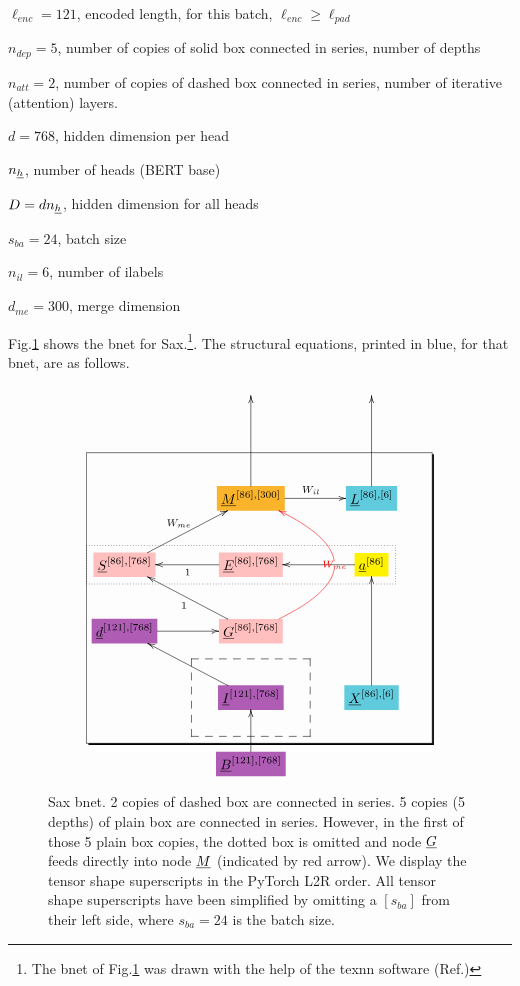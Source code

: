 $\ell_{enc}=121$, encoded length, for this batch, $\ell_{enc}\geq \ell_{pad}$

$n_{dep}=5$, number of copies of solid box connected in series, number of depths

 $n_{att}=2$, number of copies of
dashed box connected in series, number of iterative (attention) layers.


$d=768$, hidden dimension per head

$n_{\underline{h}}$, number of heads (BERT base)

$D=d n_{\underline{h}}$, hidden dimension
for all heads


$s_{ba}=24$, batch size

$n_{il}=6$, number of ilabels

$d_{me}=300$, merge dimension

Fig.\ref{fig-texnn-for-sentence-ax-bnet}
shows the bnet  for Sax.\footnote{The
bnet of Fig.\ref{fig-texnn-for-sentence-ax-bnet}
was drawn with the help of the texnn software (Ref.\cite{texnn})}. The structural equations, printed in 
blue, for that bnet, are as follows.

\begin{figure}[h!]\centering
$$\xymatrix@R=2.5pc@C=3.5pc{
&&
\\
&&
\\
&*+[F*:Dandelion]{\underline{M}^{[86], [300]}}\ar[uu]\ar[r]^{W_{il}}&*+[F*:SkyBlue]{\underline{L}^{[86], [6]}}\ar[uu]
\\
*+[F*:pink]{\underline{S}^{[86], [768]}}\ar[ur]^{W_{me}}&*+[F*:pink]{\underline{E}^{[86], [768]}}\ar[l]^{1}&*+[F*:yellow]{\underline{a}^{[86]}}\ar[l]
\\
*+[F*:Orchid]{\underline{d}^{[121], [768]}}\ar[r]&*+[F*:pink]{\underline{G}^{[86], [768]}}\ar@[red]@/_5pc/[uu]|-{\color{red} W_{me}}\ar[ul]^{1}&
\\
&*+[F*:Orchid]{\underline{I}^{[121], [768]}}\ar[ul]&*+[F*:SkyBlue]{\underline{X}^{[86], [6]}}\ar[uu]
\\
&*+[F*:Orchid]{\underline{B}^{[121], [768]}}\ar[u]&
\save
\POS"3,1"."6,1"."3,3"."6,3"!C*+<4.8em>\frm{-,}
\POS"6,2"."6,2"."6,2"."6,2"!C*+<3.8em>\frm{--}
\POS"4,1"."4,1"."4,3"."4,3"!C*+<1.0em>\frm{.}
\restore
}$$
\caption{Sax bnet. 2 copies of dashed box are connected in series. 5 copies (5 depths) of plain box are connected in series.  However, in the first of those 5 plain box copies, the dotted box  is omitted and node $\underline{G}$ feeds directly into node  $\underline{M}$ (indicated by red arrow). We display the tensor shape superscripts in the PyTorch L2R order. All tensor shape superscripts have been simplified by omitting a $[s_{ba}]$ from their left side, where $s_{ba}=24$ is the batch size. }
\label{fig-texnn-for-sentence-ax-bnet}
\end{figure}

